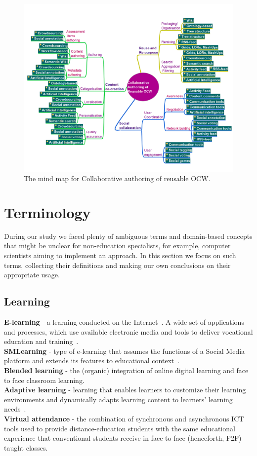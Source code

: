 \documentclass[PhD, Submit, ngerman,UKenglish,table]{scrbook}
\begin{document}
\begin{figure}[!htb]
  \centering
  \includegraphics[width=\textwidth]{images/super_map.png}
  \caption{The mind map for Collaborative authoring of reusable OCW.}
  \label{fig:super_map}
\end{figure}

\section{Terminology}
\label{sec:Terminology}
During our study we faced plenty of ambiguous terms and domain-based concepts that might be unclear for non-education specialists, for example, computer scientists aiming to implement an approach.
In this section we focus on such terms, collecting their definitions and making our own conclusions on their appropriate usage.

\subsection{Learning}
\textbf{E-learning} - a learning conducted on the Internet~\cite{Dahlan2010}.
A wide set of applications and processes, which use available electronic media and tools
to deliver vocational education and training~\cite{de2009rss}.\\
\textbf{SMLearning} - type of e-learning that assumes the functions of a Social Media platform and extends its features to educational context~\cite{Claros2013}.\\
\textbf{Blended learning} - the (organic) integration of online digital learning and face to face classroom learning\cite{Cai2010}.\\
\textbf{Adaptive learning} - learning that enables learners to customize their learning environments and dynamically adapts learning content to learners' learning needs~\cite{brusilovsky2001adaptive}.\\
\textbf{Virtual attendance} - the combination of synchronous and asynchronous ICT tools used to provide distance-education students with the same educational experience that conventional students receive in face-to-face (henceforth, F2F) taught classes.\\
\end{document}
